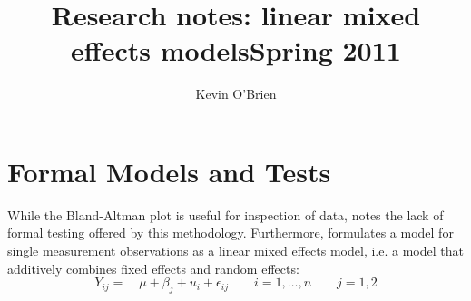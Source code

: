 \documentclass[12pt, a4paper]{report}
\title{Research notes: linear mixed effects models}
\author{ } \date{ }
\theoremstyle{plain}
\theoremstyle{definition}
\theoremstyle{remark}
\begin{document}
	\author{Kevin O'Brien}
	\title{Spring 2011}
	
	
	\tableofcontents



%
\section{Formal Models and Tests}
While the Bland-Altman plot is useful for inspection of data, \citet{Kinsella} notes the lack of formal testing offered by
this methodology. Furthermore, \citet{Kinsella} formulates a model for
single measurement observations as a
linear mixed effects model, i.e. a model that additively combines
fixed effects and random effects:
\[
Y_{ij} =\quad \mu + \beta_{j} + u_{i} + \epsilon_{ij} \qquad i = 1,\dots,n
\qquad j=1,2\]
\end{document}
